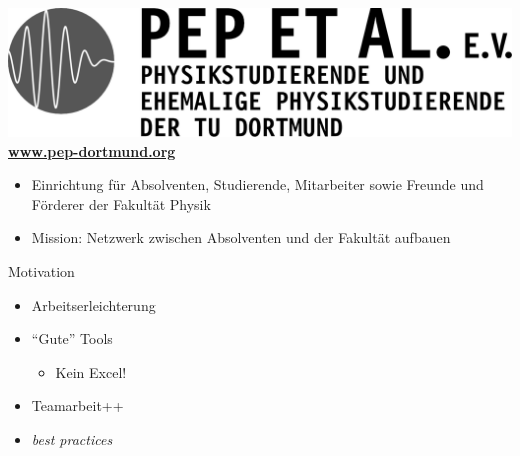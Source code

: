 \begin{frame}
  \begin{center}
    \includegraphics[width=.5\paperwidth]{logos/pep.pdf} \\
    \color{TUgreen}\textbf{\href{http://pep-dortmund.org}{www.pep-dortmund.org}}
  \end{center}
  \begin{itemize}
    \item Einrichtung für Absolventen, Studierende, Mitarbeiter sowie Freunde und Förderer der Fakultät Physik
    \item Mission: Netzwerk zwischen Absolventen und der Fakultät aufbauen
  \end{itemize}
\end{frame}

\begin{frame}{Motivation}
  \begin{itemize}
    \item Arbeitserleichterung
    \item ``Gute'' Tools \begin{itemize}
      \item Kein Excel!
    \end{itemize}
  \item Teamarbeit++
  \item \textit{best practices}
  \end{itemize}  
\end{frame}
